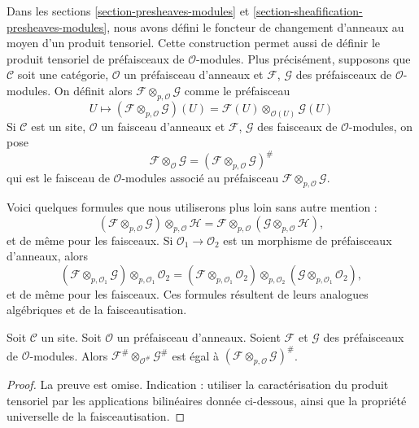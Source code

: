 \noindent
Dans les sections \ref{section-presheaves-modules} et
\ref{section-sheafification-presheaves-modules}, nous avons défini le
foncteur de changement d'anneaux au moyen d'un produit tensoriel.
Cette construction permet aussi de définir le produit tensoriel de
préfaisceaux de $\mathcal{O}$-modules. Plus précisément, supposons que
$\mathcal{C}$ soit une catégorie, $\mathcal{O}$ un préfaisceau d'anneaux et
$\mathcal{F}$, $\mathcal{G}$ des préfaisceaux de $\mathcal{O}$-modules.
On définit alors $\mathcal{F} \otimes_{p, \mathcal{O}} \mathcal{G}$ comme le
préfaisceau
$$
U
\longmapsto
(\mathcal{F} \otimes_{p, \mathcal{O}} \mathcal{G})(U)
=
\mathcal{F}(U) \otimes_{\mathcal{O}(U)} \mathcal{G}(U)
$$
Si $\mathcal{C}$ est un site, $\mathcal{O}$ un faisceau d'anneaux et
$\mathcal{F}$, $\mathcal{G}$ des faisceaux de $\mathcal{O}$-modules, on pose
$$
\mathcal{F} \otimes_\mathcal{O} \mathcal{G}
=
(\mathcal{F} \otimes_{p, \mathcal{O}} \mathcal{G})^\#
$$
qui est le faisceau de $\mathcal{O}$-modules associé au préfaisceau
$\mathcal{F} \otimes_{p, \mathcal{O}} \mathcal{G}$.

\medskip\noindent
Voici quelques formules que nous utiliserons plus loin sans autre mention :
$$
(\mathcal{F}
\otimes_{p, \mathcal{O}} \mathcal{G})
\otimes_{p, \mathcal{O}} \mathcal{H}
=
\mathcal{F}
\otimes_{p, \mathcal{O}} (\mathcal{G}
\otimes_{p, \mathcal{O}} \mathcal{H}),
$$
et de même pour les faisceaux.
Si $\mathcal{O}_1 \to \mathcal{O}_2$ est un morphisme de préfaisceaux
d'anneaux, alors
$$
(\mathcal{F} \otimes_{p, \mathcal{O}_1} \mathcal{G})
\otimes_{p, \mathcal{O}_1} \mathcal{O}_2 =
(\mathcal{F} \otimes_{p, \mathcal{O}_1} \mathcal{O}_2)
\otimes_{p, \mathcal{O}_2}
(\mathcal{G} \otimes_{p, \mathcal{O}_1} \mathcal{O}_2),
$$
et de même pour les faisceaux.
Ces formules résultent de leurs analogues algébriques et de la
faisceautisation.

\begin{lemma}
\label{lemma-sheafification-tensor}
Soit $\mathcal{C}$ un site. Soit $\mathcal{O}$ un préfaisceau d'anneaux.
Soient $\mathcal{F}$ et $\mathcal{G}$ des préfaisceaux de
$\mathcal{O}$-modules. Alors
$\mathcal{F}^\# \otimes_{\mathcal{O}^\#} \mathcal{G}^\#$
est égal à
$(\mathcal{F} \otimes_{p, \mathcal{O}} \mathcal{G})^\#$.
\end{lemma}

\begin{proof}
La preuve est omise. Indication : utiliser la caractérisation du produit
tensoriel par les applications bilinéaires donnée ci-dessous, ainsi que la
propriété universelle de la faisceautisation.
\end{proof}

